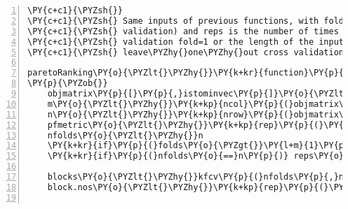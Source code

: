\begin{Verbatim}[commandchars=\\\{\},codes={\catcode`\$=3\catcode`\^=7\catcode`\_=8},gobble=0,numbers=left,fontfamily=fvm,fontshape=n,fontsize=\footnotesize,tabsize=2]
\PY{c+c1}{\PYZsh{}}
\PY{c+c1}{\PYZsh{} Same inputs of previous functions, with folds (aka $k$\PYZhy{}fold cross  }
\PY{c+c1}{\PYZsh{} validation) and reps is the number of times we re\PYZhy{}do the cross }
\PY{c+c1}{\PYZsh{} validation fold=1 or the length of the input (i.e. n) creates }
\PY{c+c1}{\PYZsh{} leave\PYZhy{}one\PYZhy{}out cross validation}

paretoRanking\PY{o}{\PYZlt{}\PYZhy{}}\PY{k+kr}{function}\PY{p}{(}objmatrix\PY{p}{,}istominvec\PY{p}{,}noFronts\PY{o}{=}\PY{l+m}{20}\PY{p}{,}folds\PY{o}{=}\PY{l+m}{1}\PY{p}{,}reps\PY{o}{=}\PY{l+m}{5}\PY{p}{)}
\PY{p}{\PYZob{}}
	objmatrix\PY{p}{[}\PY{p}{,}istominvec\PY{p}{]}\PY{o}{\PYZlt{}\PYZhy{}} \PY{o}{\PYZhy{}}objmatrix\PY{p}{[}\PY{p}{,}istominvec\PY{p}{]}
	m\PY{o}{\PYZlt{}\PYZhy{}}\PY{k+kp}{ncol}\PY{p}{(}objmatrix\PY{p}{)}
	n\PY{o}{\PYZlt{}\PYZhy{}}\PY{k+kp}{nrow}\PY{p}{(}objmatrix\PY{p}{)}
	pfmetric\PY{o}{\PYZlt{}\PYZhy{}}\PY{k+kp}{rep}\PY{p}{(}\PY{l+m}{0}\PY{p}{,}n\PY{p}{)} \PY{c+c1}{\PYZsh{}output vector}
	nfolds\PY{o}{\PYZlt{}\PYZhy{}}n
	\PY{k+kr}{if}\PY{p}{(}folds\PY{o}{\PYZgt{}}\PY{l+m}{1}\PY{p}{)} nfolds\PY{o}{\PYZlt{}\PYZhy{}}folds
	\PY{k+kr}{if}\PY{p}{(}nfolds\PY{o}{==}n\PY{p}{)} reps\PY{o}{\PYZlt{}\PYZhy{}}\PY{l+m}{1}
	
	blocks\PY{o}{\PYZlt{}\PYZhy{}}kfcv\PY{p}{(}nfolds\PY{p}{,}n\PY{p}{)}
	block.nos\PY{o}{\PYZlt{}\PYZhy{}}\PY{k+kp}{rep}\PY{p}{(}\PY{l+m}{1}\PY{o}{:}nfolds\PY{p}{,}blocks\PY{p}{)}
	

\end{Verbatim}
